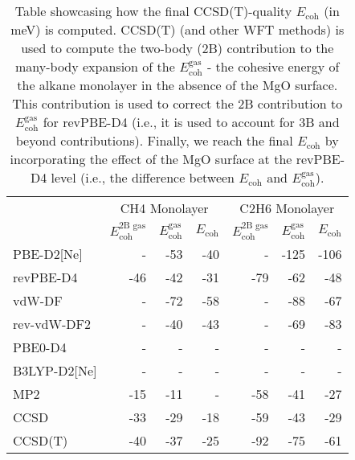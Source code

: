 \begin{table}
\caption{\label{tab:monolayer_ecoh}Table showcasing how the final CCSD(T)-quality $E_\textrm{coh}$ (in meV) is computed. CCSD(T) (and other WFT methods) is used to compute the two-body (2B) contribution to the many-body expansion of the $E_\textrm{coh}^\textrm{gas}$ - the cohesive energy of the alkane monolayer in the absence of the MgO surface. This contribution is used to correct the 2B contribution to $E_\textrm{coh}^\textrm{gas}$ for revPBE-D4 (i.e., it is used to account for 3B and beyond contributions). Finally, we reach the final $E_\textrm{coh}$ by incorporating the effect of the MgO surface at the revPBE-D4 level (i.e., the difference between $E_\textrm{coh}$ and $E_\textrm{coh}^\textrm{gas}$).}
\begin{adjustbox}{center}
\begin{tabular}{lrrrrrr}
\toprule
 & \multicolumn{3}{c}{CH4 Monolayer} & \multicolumn{3}{c}{C2H6 Monolayer} \\ 
 & $E_\textrm{coh}^\textrm{2B gas}$ & $E_\textrm{coh}^\textrm{gas}$ & $E_\textrm{coh}$ & $E_\textrm{coh}^\textrm{2B gas}$ & $E_\textrm{coh}^\textrm{gas}$ & $E_\textrm{coh}$ \\
\midrule
PBE-D2[Ne] & - & -53 & -40 & - & -125 & -106 \\
revPBE-D4 & -46 & -42 & -31 & -79 & -62 & -48 \\
vdW-DF & - & -72 & -58 & - & -88 & -67 \\
rev-vdW-DF2 & - & -40 & -43 & - & -69 & -83 \\
PBE0-D4 & - & - & - & - & - & - \\
B3LYP-D2[Ne] & - & - & - & - & - & - \\
MP2 & -15 & -11 & - & -58 & -41 & -27 \\
CCSD & -33 & -29 & -18 & -59 & -43 & -29 \\
CCSD(T) & -40 & -37 & -25 & -92 & -75 & -61 \\
\bottomrule
\end{tabular}
\end{adjustbox}
\end{table}